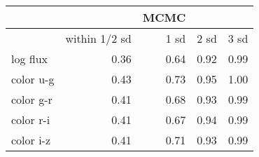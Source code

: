 \begin{tabular}{lrrrr}
{} &  &  \textbf{MCMC} &  & \\
\toprule
{} & within 1/2 sd &  1 sd &  2 sd &  3 sd \\
\midrule
log flux &         0.36 & 0.64 & 0.92 & 0.99 \\
color u-g   &         0.43 & 0.73 & 0.95 & 1.00 \\
color g-r   &         0.41 & 0.68 & 0.93 & 0.99 \\
color r-i   &         0.41 & 0.67 & 0.94 & 0.99 \\
color i-z   &         0.41 & 0.71 & 0.93 & 0.99 \\
\bottomrule
\end{tabular}

